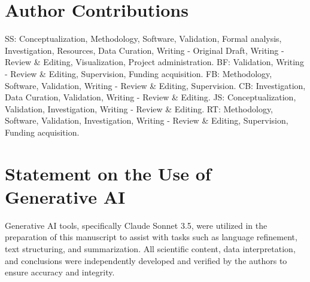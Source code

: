 \documentclass[12pt,a4paper]{article}
\begin{document}
\section*{Author Contributions}
SS: Conceptualization, Methodology, Software, Validation, Formal analysis, Investigation, Resources, Data Curation, Writing - Original Draft, Writing - Review \& Editing, Visualization, Project administration. BF: Validation, Writing - Review \& Editing, Supervision, Funding acquisition. FB: Methodology, Software, Validation, Writing - Review \& Editing, Supervision. CB: Investigation, Data Curation, Validation, Writing - Review \& Editing. JS: Conceptualization, Validation, Investigation, Writing - Review \& Editing. RT: Methodology, Software, Validation, Investigation, Writing - Review \& Editing, Supervision, Funding acquisition.

\section*{Statement on the Use of Generative AI}
Generative AI tools, specifically Claude Sonnet 3.5, were utilized in the preparation of this manuscript to assist with tasks such as language refinement, text structuring, and summarization. All scientific content, data interpretation, and conclusions were independently developed and verified by the authors to ensure accuracy and integrity.




\clearpage

\end{document}
